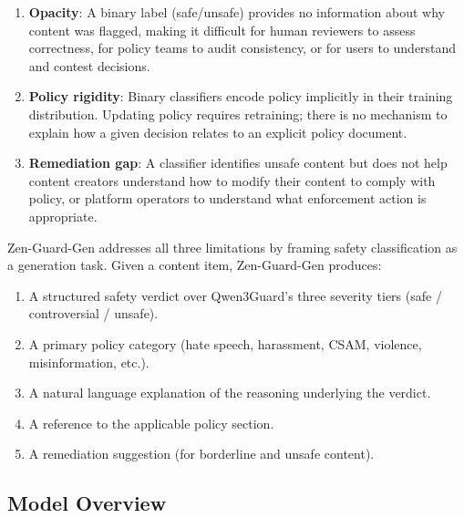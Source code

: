 \documentclass[11pt,a4paper]{article}
\begin{document}
\begin{enumerate}
  \item \textbf{Opacity}: A binary label (safe/unsafe) provides no information about why content was flagged, making it difficult for human reviewers to assess correctness, for policy teams to audit consistency, or for users to understand and contest decisions.
  \item \textbf{Policy rigidity}: Binary classifiers encode policy implicitly in their training distribution. Updating policy requires retraining; there is no mechanism to explain how a given decision relates to an explicit policy document.
  \item \textbf{Remediation gap}: A classifier identifies unsafe content but does not help content creators understand how to modify their content to comply with policy, or platform operators to understand what enforcement action is appropriate.
\end{enumerate}

Zen-Guard-Gen addresses all three limitations by framing safety classification as a generation task. Given a content item, Zen-Guard-Gen produces:

\begin{enumerate}
  \item A structured safety verdict over Qwen3Guard's three severity tiers (safe / controversial / unsafe).
  \item A primary policy category (hate speech, harassment, CSAM, violence, misinformation, etc.).
  \item A natural language explanation of the reasoning underlying the verdict.
  \item A reference to the applicable policy section.
  \item A remediation suggestion (for borderline and unsafe content).
\end{enumerate}

\subsection{Model Overview}
\end{document}
